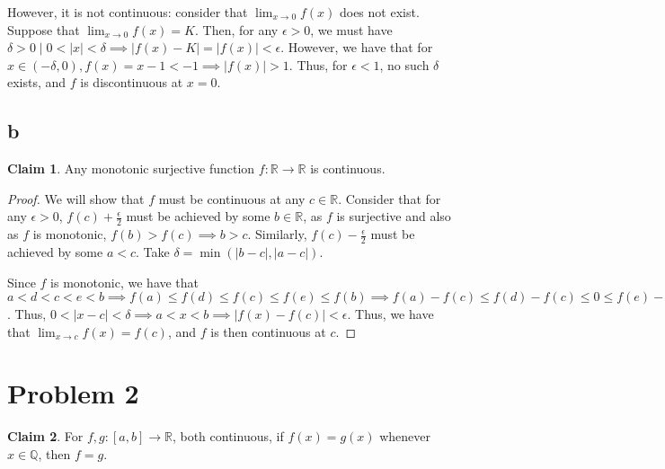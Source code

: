 \documentclass[12pt,letterpaper]{article}
\theoremstyle{definition}
\newtheorem*{claim}{Claim}
\newcommand{\R}{\mathbb{R}}
\newcommand{\Q}{\mathbb{Q}}
\begin{document}
However, it is not continuous: consider that $\lim_{x \rightarrow 0}f(x)$ does
not exist. Suppose that $\lim_{x\rightarrow 0}f(x) = K$. Then, for any $\epsilon
> 0$, we must have $\delta > 0 \mid 0 < |x| < \delta \implies |f(x) - K| =
|f(x)| < \epsilon$. However, we have that for $x \in (-\delta,0), f(x) = x - 1 <
-1 \implies |f(x)| > 1$. Thus, for $\epsilon < 1$, no such $\delta$ exists, and
$f$ is discontinuous at $x = 0$.

\subsection*{b}

\begin{claim}
  Any monotonic surjective function $f: \R \rightarrow \R$ is continuous.
\end{claim}

\begin{proof}
  We will show that $f$ must be continuous at any $c \in \R$. Consider that
  for any $\epsilon > 0$, $f(c) + \frac{\epsilon}{2}$ must be achieved by some $b \in \R$,
  as $f$ is surjective and also as $f$ is monotonic, $f(b) > f(c) \implies b > c$. Similarly, $f(c) -
  \frac{\epsilon}{2}$ must be achieved by some $a < c$. Take $\delta = \min(|b-c|,
  |a-c|)$. 

  Since $f$ is monotonic, we have that $a < d < c < e < b \implies f(a) \leq
  f(d) \leq f(c) \leq f(e) \leq f(b) \implies f(a) - f(c) \leq f(d) - f(c) \leq
  0 \leq f(e) - f(c) \leq f(b) - f(c) \implies -\frac{\epsilon}{2} \leq f(d) -
  f(c) < f(e) - f(c) \leq \frac{\epsilon}{2} \implies |f(d) - f(c)|, |f(e) -
  f(c)| \leq \frac{\epsilon}{2} < \epsilon$. Thus, $0 < |x-c| < \delta \implies
  a < x < b \implies |f(x) - f(c)| < \epsilon$. Thus, we have that
  $\lim_{x\rightarrow c}f(x) = f(c)$, and $f$ is then continuous at $c$.
\end{proof}

\section*{Problem 2}

\begin{claim}
  For $f,g:[a,b] \rightarrow \R$, both continuous, if $f(x) = g(x)$ whenever $x \in
  \Q$, then $f = g$.
\end{claim}
\end{document}
